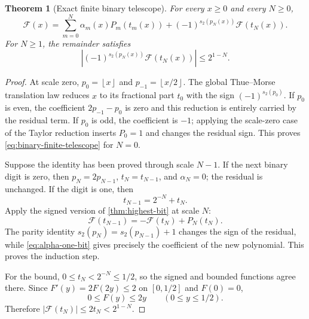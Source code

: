 \documentclass[11pt]{article}
\numberwithin{equation}{section}
\newtheorem{theorem}{Theorem}[section]
\theoremstyle{definition}
\theoremstyle{remark}
\newcommand{\GF}{\mathcal F}
\newcommand{\floor}[1]{\left\lfloor#1\right\rfloor}
\begin{document}
\begin{theorem}[Exact finite binary telescope]\label{thm:binary-finite-telescope}
For every $x\ge0$ and every $N\ge0$,
\begin{equation}\label{eq:binary-finite-telescope}
\boxed{
 \GF(x)=\sum_{m=0}^{N}\alpha_m(x)P_m(t_m(x))
 +(-1)^{s_2(p_N(x))}\GF(t_N(x)).}
\end{equation}
For $N\ge1$, the remainder satisfies
\begin{equation}\label{eq:binary-remainder-bound}
 \left|(-1)^{s_2(p_N(x))}\GF(t_N(x))\right|
 \le 2^{1-N}.
\end{equation}
\end{theorem}

\begin{proof}
At scale zero, $p_0=\floor{x}$ and $p_{-1}=\floor{x/2}$.  The global
Thue--Morse translation law reduces $x$ to its fractional part $t_0$ with the
sign $(-1)^{s_2(p_0)}$.  If $p_0$ is even, the coefficient
$2p_{-1}-p_0$ is zero and this reduction is entirely carried by the residual
term.  If $p_0$ is odd, the coefficient is $-1$; applying the scale-zero case
of the Taylor reduction inserts $P_0=1$ and changes the residual sign.  This
proves \eqref{eq:binary-finite-telescope} for $N=0$.

Suppose the identity has been proved through scale $N-1$.  If the next binary
digit is zero, then $p_N=2p_{N-1}$, $t_N=t_{N-1}$, and
$\alpha_N=0$; the residual is unchanged.  If the digit is one, then
\begin{equation}\label{eq:binary-tail-step}
 t_{N-1}=2^{-N}+t_N.
\end{equation}
Apply the signed version of \cref{thm:highest-bit} at scale $N$:
\begin{equation}\label{eq:binary-reduction-step}
 \GF(t_{N-1})=-\GF(t_N)+P_N(t_N).
\end{equation}
The parity identity
$s_2(p_N)=s_2(p_{N-1})+1$ changes the sign of the residual, while
\eqref{eq:alpha-one-bit} gives precisely the coefficient of the new
polynomial.  This proves the induction step.

For the bound, $0\le t_N<2^{-N}\le1/2$, so the signed and bounded functions
agree there.  Since $F'(y)=2F(2y)\le2$ on $[0,1/2]$ and $F(0)=0$,
\begin{equation}\label{eq:F-linear-tail-bound}
 0\le F(y)\le2y\qquad(0\le y\le1/2).
\end{equation}
Therefore $|\GF(t_N)|\le2t_N<2^{1-N}$.
\end{proof}
\end{document}
